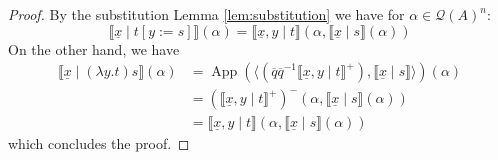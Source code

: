 \documentclass[12pt]{article}
\theoremstyle{plain}
\theoremstyle{definition}
\newcommand{\call}[1]{\mathcal{#1}}
\newcommand{\Qcal}{\call{Q}}
\begin{document}
	\begin{proof}
		By the substitution Lemma \ref{lem:substitution} we have for $\alpha \in \Qcal(A)^n$:
		\begin{equation}
			\llbracket \underline{x} \mid t[y:=s]\rrbracket(\alpha) = \llbracket \underline{x}, y \mid t\rrbracket(\alpha, \llbracket \underline{x} \mid s \rrbracket(\alpha))
			\end{equation}
		On the other hand, we have
		\begin{align*}
			\llbracket \underline{x} \mid (\lambda y.t)s\rrbracket(\alpha) &= \operatorname{App}(\big\langle (\overline{q} \overline{q}^{-1}\llbracket \underline{x}, y \mid t \rrbracket^+), \llbracket \underline{x} \mid s \rrbracket\big\rangle)(\alpha)\\
			&=(\llbracket \underline{x}, y \mid t\rrbracket^+)^-(\alpha, \llbracket\underline{x} \mid s \rrbracket(\alpha))\\
			&= \llbracket \underline{x}, y \mid t \rrbracket (\alpha, \llbracket \underline{x} \mid s \rrbracket(\alpha))
			\end{align*}
		which concludes the proof.
		\end{proof}
\end{document}
